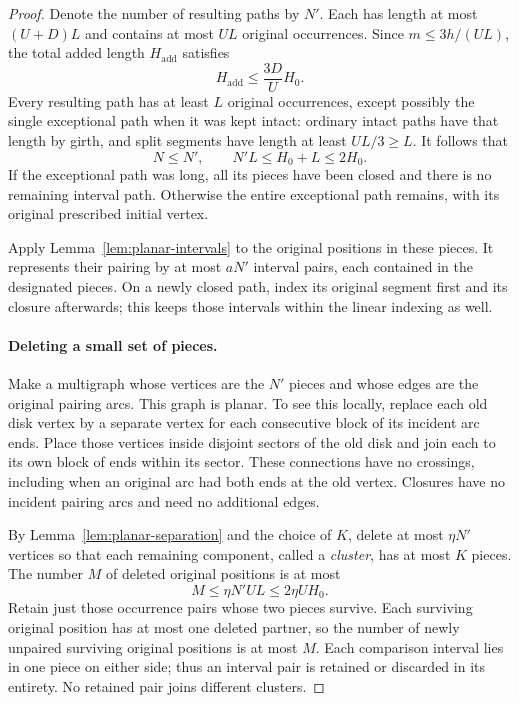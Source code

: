 \begin{proof}
Denote the number of resulting paths by $N'$.  Each has length at most
$(U+D)L$ and contains at most $UL$ original occurrences.  Since
$m\le3h/(UL)$, the total added length $H_{\mathrm{add}}$ satisfies
\begin{equation}
 H_{\mathrm{add}}\le\frac{3D}{U}H_0.
 \label{eq:closure-mass}
\end{equation}
Every resulting path has at least $L$ original occurrences, except
possibly the single exceptional path when it was kept intact: ordinary
intact paths have that length by girth, and split segments have length
at least $UL/3\ge L$.  It follows that
\begin{equation}
 N\le N',\qquad N'L\le H_0+L\le2H_0.
 \label{eq:piece-count}
\end{equation}
If the exceptional path was long, all its pieces have been closed and
there is no remaining interval path.  Otherwise the entire exceptional
path remains, with its original prescribed initial vertex.

Apply Lemma~\ref{lem:planar-intervals} to the original positions in
these pieces.  It represents their pairing by at most $aN'$ interval
pairs, each contained in the designated pieces.  On a newly closed
path, index its original segment first and its closure afterwards;
this keeps those intervals within the linear indexing as well.

\paragraph{Deleting a small set of pieces.}
Make a multigraph whose vertices are the $N'$ pieces and whose edges
are the original pairing arcs.  This graph is planar.  To see this
locally, replace each old disk vertex by a separate vertex for each
consecutive block of its incident arc ends.  Place those vertices
inside disjoint sectors of the old disk and join each to its own block
of ends within its sector.  These connections have no crossings,
including when an original arc had both ends at the old vertex.
Closures have no incident pairing arcs and need no additional edges.

By Lemma~\ref{lem:planar-separation} and the choice of $K$, delete at
most $\eta N'$ vertices so that each remaining component, called a
\emph{cluster}, has at most $K$ pieces.  The number $M$ of deleted
original positions is at most
\begin{equation}
 M\le\eta N'UL\le2\eta U H_0.
 \label{eq:deleted-mass}
\end{equation}
Retain just those occurrence pairs whose two pieces survive.  Each
surviving original position has at most one deleted partner, so the
number of newly unpaired surviving original positions is at most $M$.
Each comparison interval lies in one piece on either side; thus an
interval pair is retained or discarded in its entirety.  No retained
pair joins different clusters.


\end{proof}
